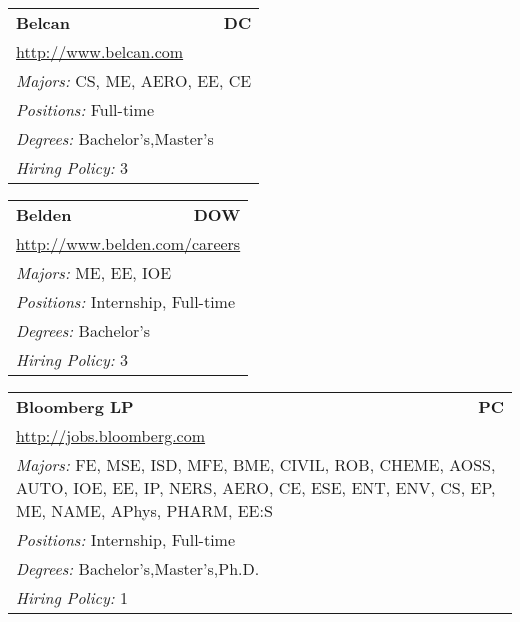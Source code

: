 \documentclass[twoside]{article}
\begin{document}
\begin{center}
\begin{multicols}{3}
\begin{FlushLeft}
\begin{minipage}{.9\columnwidth}
\end{minipage}
 
\begin{minipage}{.9\columnwidth}\begin{tabularx}{.95\columnwidth}{Xr}
                 {\Large\bf Belcan} & {\Large\bf DC}\\
    \multicolumn{2}{p{.95\columnwidth}}{\url{http://www.belcan.com}}\\
    \multicolumn{2}{p{.95\columnwidth}}{\emph{Majors:} CS, ME, AERO, EE, CE}\\
    \multicolumn{2}{p{.95\columnwidth}}{\emph{Positions:} Full-time}\\
    \multicolumn{2}{p{.95\columnwidth}}{\emph{Degrees:} Bachelor's,Master's}\\
    \multicolumn{2}{p{.95\columnwidth}}{\emph{Hiring Policy:} 3}\\
    \end{tabularx}
    
\end{minipage}
 
\begin{minipage}{.9\columnwidth}\begin{tabularx}{.95\columnwidth}{Xr}
                 {\Large\bf Belden} & {\Large\bf DOW}\\
    \multicolumn{2}{p{.95\columnwidth}}{\url{http://www.belden.com/careers}}\\
    \multicolumn{2}{p{.95\columnwidth}}{\emph{Majors:} ME, EE, IOE}\\
    \multicolumn{2}{p{.95\columnwidth}}{\emph{Positions:} Internship, Full-time}\\
    \multicolumn{2}{p{.95\columnwidth}}{\emph{Degrees:} Bachelor's}\\
    \multicolumn{2}{p{.95\columnwidth}}{\emph{Hiring Policy:} 3}\\
    \end{tabularx}
    
\end{minipage}
 
\begin{minipage}{.9\columnwidth}\begin{tabularx}{.95\columnwidth}{Xr}
                 {\Large\bf Bloomberg LP} & {\Large\bf PC}\\
    \multicolumn{2}{p{.95\columnwidth}}{\url{http://jobs.bloomberg.com}}\\
    \multicolumn{2}{p{.95\columnwidth}}{\emph{Majors:} FE, MSE, ISD, MFE, BME, CIVIL, ROB, CHEME, AOSS, AUTO, IOE, EE, IP, NERS, AERO, CE, ESE, ENT, ENV, CS, EP, ME, NAME, APhys, PHARM, EE:S}\\
    \multicolumn{2}{p{.95\columnwidth}}{\emph{Positions:} Internship, Full-time}\\
    \multicolumn{2}{p{.95\columnwidth}}{\emph{Degrees:} Bachelor's,Master's,Ph.D.}\\
    \multicolumn{2}{p{.95\columnwidth}}{\emph{Hiring Policy:} 1}\\
    \end{tabularx}
    

\end{minipage}
\end{FlushLeft}
\end{multicols}
\end{center}
\end{document}

